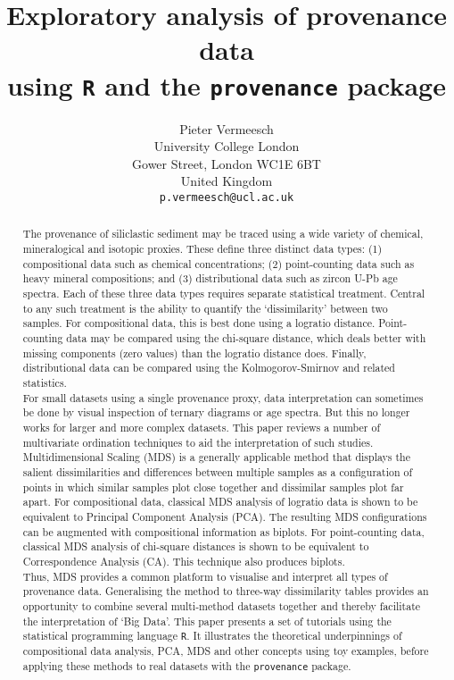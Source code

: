 \documentclass[11pt]{article}
\title{Exploratory analysis of provenance data\\ using \texttt{R} and
  the \texttt{provenance} package}
\author{Pieter Vermeesch\\
  University College London\\
  Gower Street, London WC1E 6BT\\
  United Kingdom\\
  \texttt{p.vermeesch@ucl.ac.uk}
}
\date{}
\begin{document}
\maketitle

\begin{abstract}
  The provenance of siliclastic sediment may be traced using a wide
  variety of chemical, mineralogical and isotopic proxies. These
  define three distinct data types: (1) compositional data such as
  chemical concentrations; (2) point-counting data such as heavy
  mineral compositions; and (3) distributional data such as zircon
  U-Pb age spectra. Each of these three data types requires separate
  statistical treatment. Central to any such treatment is the ability
  to quantify the `dissimilarity' between two samples. For
  compositional data, this is best done using a logratio
  distance. Point-counting data may be compared using the chi-square
  distance, which deals better with missing components (zero values)
  than the logratio distance does. Finally, distributional data can be
  compared using the Kolmogorov-Smirnov and related statistics.\\

  For small datasets using a single provenance proxy, data
  interpretation can sometimes be done by visual inspection of ternary
  diagrams or age spectra. But this no longer works for larger and
  more complex datasets. This paper reviews a number of multivariate
  ordination techniques to aid the interpretation of such
  studies. Multidimensional Scaling (MDS) is a generally applicable
  method that displays the salient dissimilarities and differences
  between multiple samples as a configuration of points in which
  similar samples plot close together and dissimilar samples plot far
  apart.  For compositional data, classical MDS analysis of logratio
  data is shown to be equivalent to Principal Component Analysis
  (PCA). The resulting MDS configurations can be augmented with
  compositional information as biplots. For point-counting data,
  classical MDS analysis of chi-square distances is shown to be
  equivalent to Correspondence Analysis (CA). This technique also
  produces biplots.\\

  Thus, MDS provides a common platform to visualise and interpret all
  types of provenance data. Generalising the method to three-way
  dissimilarity tables provides an opportunity to combine several
  multi-method datasets together and thereby facilitate the
  interpretation of `Big Data'.  This paper presents a set of
  tutorials using the statistical programming language \texttt{R}. It
  illustrates the theoretical underpinnings of compositional data
  analysis, PCA, MDS and other concepts using toy examples, before
  applying these methods to real datasets with the \texttt{provenance}
  package.
\end{abstract}
\end{document}
